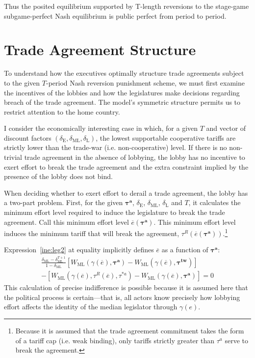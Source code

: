\documentclass[authoryear, review]{elsarticle}
\newcommand{\ov}{\overline}
\newcommand{\bta}{\bm{\tau^a}}
\newcommand{\ga}{\gamma}
\newcommand{\btw}{\bm{\tau^{tw}}}
\newcommand{\de}{\delta}
\begin{document}
Thus the posited equilibrium supported by T-length reversions to the stage-game subgame-perfect Nash equilibrium is public perfect from period to period.

\section{Trade Agreement Structure}
\label{sec:structure}
To understand how the executives optimally structure trade agreements subject to the given $T$-period Nash reversion punishment scheme, we must first examine the incentives of the lobbies and how the legislatures make decisions regarding breach of the trade agreement. The model's symmetric structure permits us to restrict attention to the home country.

I consider the economically interesting case in which, for a given $T$ and vector of discount factors $\left(\de_\text{E},\de_\text{ML},\de_\text{L}\right)$, the lowest supportable cooperative tariffs are strictly lower than the trade-war (i.e. non-cooperative) level. If there is no non-trivial trade agreement in the absence of lobbying, the lobby has no incentive to exert effort to break the trade agreement and the extra constraint implied by the presence of the lobby does not bind.

When deciding whether to exert effort to derail a trade agreement, the lobby has a two-part problem. First, for the given $\bta$, $\de_\text{E}$, $\de_\text{ML}$, $\de_\text{L}$ and $T$, it calculates the minimum effort level required to induce the legislature to break the trade agreement. Call this minimum effort level $\ov{e}(\bta)$. This minimum effort level induces the minimum tariff that will break the agreement, $\tau^R(\ov{e}(\bta))$.\footnote{Because it is assumed that the trade agreement commitment takes the form of a tariff cap (i.e. weak binding), only tariffs strictly greater than $\tau^a$ serve to break the agreement.}

Expression~\ref{ine:leg2} at equality implicitly defines $\ov{e}$ as a function of $\bta$:
\begin{multline}
  \frac{\de_\text{ML} - \de_\text{ML}^{T+1}}{1-\de_\text{ML}} \left[W_\text{ML}(\ga(\ov{e}),\bta) - W_\text{ML}(\ga(\ov{e}),\btw) \right] \\
	- \left[ W_\text{ML}(\ga(\ov{e}),\tau^R(\ov{e}),\tau^{*a}) - W_\text{ML}(\ga(\ov{e}),\bta) \right] = 0
  \label{eq:leg2}
\end{multline}
This calculation of precise indifference is possible because it is assumed here that the political process is certain---that is, all actors know precisely how lobbying effort affects the identity of the median legislator through $\ga(e)$.
\end{document}
